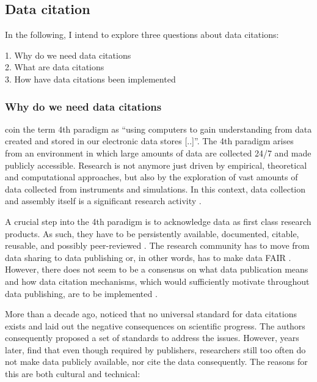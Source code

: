 \documentclass[a4paper,10pt]{article}
\begin{document}
\newpage

\subsection{Data citation}
In the following, I intend to explore three questions about data citations:

1. Why do we need data citations \\
2. What are data citations \\
3. How have data citations been implemented \\


\subsubsection{Why do we need data citations}    
\citep{Hey2009} coin the term 4th paradigm as ``using computers to gain understanding from data created and stored in our electronic data stores [..]''.
The 4th paradigm arises from an environment in which large amounts of data are collected 24/7 and made publicly accessible. Research is not anymore just driven by empirical, theoretical and computational approaches, but also by the exploration of vast amounts of data collected from instruments and simulations. In this context, data collection and assembly itself is a significant research activity \citep{Frew2012}.


A crucial step into the 4th paradigm is to acknowledge data as first class research products. As such, they have to be persistently available, documented, citable, reusable, and possibly peer-reviewed \citep{Callaghan2012, Kratz2014}. The research community has to move from data sharing to data publishing \citep{Costello2009, Kratz2014} or, in other words, has to make data \gls{FAIR} \citep{Wilkinson2016}. However, there does not seem to be a consensus on what data publication means \citep{Kratz2014} and how data citation mechanisms, which would sufficiently motivate throughout data publishing, are to be implemented \citep{Costello2009}.

More than a decade ago, \citep{AltKin07} noticed that no universal standard for data citations exists and laid out the negative consequences on scientific progress. The authors consequently proposed a set of standards to address the issues. However, years later, \citep{Altman2015, Tenopir2011} find that even though required by publishers, researchers still too often do not make data publicly available, nor cite the data consequently.
The reasons for this are both cultural and technical: 
\end{document}
